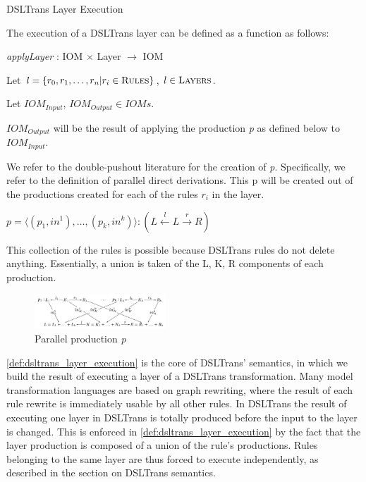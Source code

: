 \begin{definition} {DSLTrans Layer Execution}
\label{def:dsltrans_layer_execution}


The execution of a DSLTrans layer can be defined as a function as follows:

\textit{applyLayer} : IOM $\times$ Layer $\rightarrow$ IOM

Let $l = \{r_0, r_1, \dots, r_n | r_i \in \textsc{Rules}\}$, $l \in \textsc{Layers}$.

Let $\mathit{IOM}_{Input}$, $\mathit{IOM}_{Output} \in \mathit{IOMs}$.

$\mathit{IOM}_{Output}$ will be the result of applying the production \textit{p} as defined below to $\mathit{IOM}_{Input}.$

We refer to the double-pushout literature for the creation of \textit{p}. Specifically, we refer to the definition of parallel direct derivations. This p will be created out of the productions created for each of the rules $r_i$ in the layer.

$p = \big\langle (p_1, {in}^1), \dots, (p_k, {in}^k) \big\rangle : (L \xleftarrow{l} L \xrightarrow{r} R)$

This collection of the rules is possible because DSLTrans rules do not delete anything. Essentially, a union is taken of the L, K, R components of each production.
\end{definition}

\begin{figure}[h!] \centering
\includegraphics[width=0.44\textwidth]{figures/formal/parallel_productions}
	\caption{Parallel production \textit{p}}
	\label{fig:parallel_productions}
\end{figure}


\cref{def:dsltrans_layer_execution} is the core of DSLTrans' semantics, in which we build the result of executing a layer of a DSLTrans transformation. Many model transformation languages are based on graph rewriting, where the result of each rule rewrite is immediately usable by all other rules. In DSLTrans the result of executing one layer in DSLTrans is totally produced before the input to the layer is changed. This is enforced in \cref{def:dsltrans_layer_execution} by the fact that the layer production is composed of a union of the rule's productions. Rules belonging to the same layer are thus forced to execute independently, as described in the section on DSLTrans semantics.

